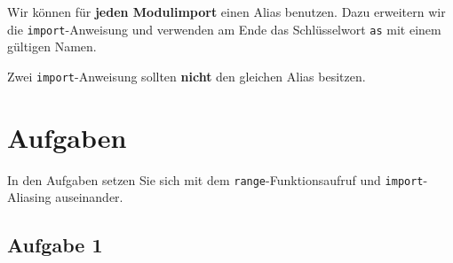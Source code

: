 Wir können für \textbf{jeden Modulimport} einen Alias benutzen. Dazu erweitern wir die \lstinline{import}-Anweisung und verwenden am Ende das Schlüsselwort \lstinline{as} mit einem gültigen Namen.

\begin{important}
	Zwei \lstinline{import}-Anweisung sollten \textbf{nicht} den gleichen Alias besitzen.
\end{important}

\newpage

\section{Aufgaben}

In den Aufgaben setzen Sie sich mit dem \lstinline{range}-Funktionsaufruf und \lstinline{import}-Aliasing auseinander.

\subsection{Aufgabe 1}

